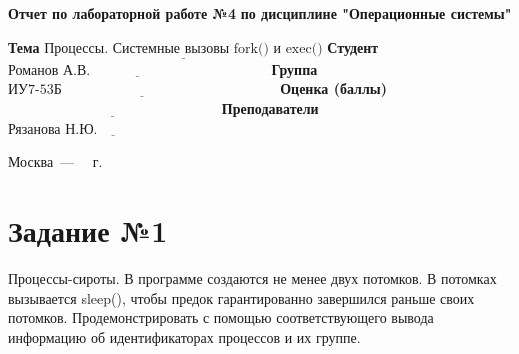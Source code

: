 \documentclass[12pt]{report}
\begin{document}
\begin{titlepage}
	
	\begin{center}
		\noindent\begin{minipage}{1.3\textwidth}\centering
			\Large\textbf{  Отчет по лабораторной работе №4}\newline
			\textbf{по дисциплине "Операционные системы"}\newline\newline
		\end{minipage}
	\end{center}
	
	\noindent\textbf{Тема} $\underline{\text{Процессы. Системные вызовы fork() и exec()}}$\newline\newline
	\noindent\textbf{Студент} $\underline{\text{Романов А.В.~~~~~~~~~~~~~~~~~~~~~~~~~~~~~~~~~~~~~~}}$\newline\newline
	\noindent\textbf{Группа} $\underline{\text{ИУ7-53Б~~~~~~~~~~~~~~~~~~~~~~~~~~~~~~~~~~~~~~~~~~~~~~}}$\newline\newline
	\noindent\textbf{Оценка (баллы)} $\underline{\text{~~~~~~~~~~~~~~~~~~~~~~~~~~~~~~~~~~~~~~~~~~~~~}}$\newline\newline
	\noindent\textbf{Преподаватели} $\underline{\text{Рязанова Н.Ю.~~~~~~~~~~~~~~~~~~~~~~~~~~}}$\newline\newline\newline
	
	\begin{center}
		\vfill
		Москва~---~\the\year
		~г.
	\end{center}
\end{titlepage}

\newpage

\section*{Задание №1}

Процессы-сироты. В программе создаются не менее двух потомков. В потомках вызывается sleep(), чтобы предок гарантированно завершился
раньше своих потомков. Продемонстрировать с помощью соответствующего вывода информацию об идентификаторах процессов и их группе.
\end{document}
